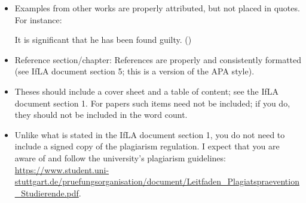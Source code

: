 \documentclass[11pt,fleqn,a4paper/thesis]{article}
\newcommand{\6}{\mbox{$[\hspace*{-.6mm}[$}}
\newcommand{\9}{\mbox{$]\hspace*{-.6mm}]$}}
\begin{document}
\begin{itemize}[itemsep=-1pt,leftmargin=2.5ex,topsep=-2pt]
\item Examples from other works are properly attributed, but not placed in quotes. For instance:

\begin{exe}
\ex It is significant that he has been found guilty. \hfill (\citealt[144]{kiparsky-kiparsky70})
\end{exe}

\item Reference section/chapter: References are properly and consistently formatted (see IfLA document section 5; this is a version of the APA style).

\item Theses should include a cover sheet and a table of content; see the IfLA document section 1. For papers such items need not be included; if you do, they should not be included in the word count.

\item Unlike what is stated in the IfLA document section 1, you do not need to include a signed copy of the plagiarism regulation. I expect that you are aware of and follow the university's plagiarism guidelines: \url{https://www.student.uni-stuttgart.de/pruefungsorganisation/document/Leitfaden_Plagiatspraevention_Studierende.pdf}.

\end{itemize}
	


\end{document}
